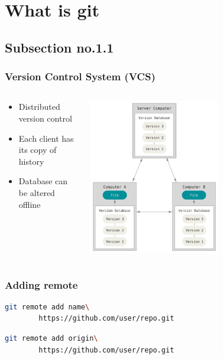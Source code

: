 \documentclass[hyperref={pdfpagelabels=false}]{beamer}
\begin{document}
\section{What is git} 
\subsection{Subsection no.1.1}
\begin{frame}
\frametitle{Version Control System (VCS)}
\begin{columns}
\begin{column}{0.4\textwidth}
	\begin{itemize}
		\item Distributed version control
		\item Each client has its copy of history
		\item Database can be altered offline
	\end{itemize}
\end{column}
\begin{column}{0.6\textwidth}  %
    \begin{center}
     \includegraphics[width=0.6\textwidth]{distributed}
     \end{center}
\end{column} 
\end{columns}
\end{frame}

\begin{frame}[fragile]
\frametitle{Adding remote}
	\begin{lstlisting}[language=bash, caption={Add remote}]
	git remote add name\
		https://github.com/user/repo.git
	\end{lstlisting}
	
	\begin{lstlisting}[language=bash, caption={Add remote called origin}]
	git remote add origin\
		https://github.com/user/repo.git
	\end{lstlisting}
\end{frame}
\end{document}
